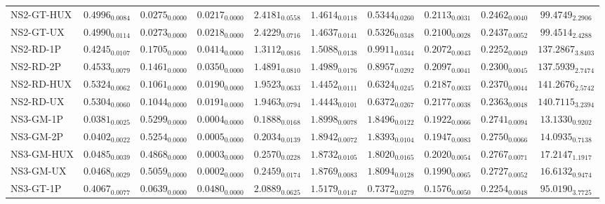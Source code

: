 \begin{longtable}{@{}lccccccccc@{}}
NS2-GT-HUX & $\mathbf{0.4996}_{0.0084}$ & $\mathbf{0.0275}_{0.0000}$ & $0.0217_{0.0000}$ & $\mathbf{2.4181}_{0.0558}$ & $1.4614_{0.0118}$ & $\mathbf{0.5344}_{0.0260}$ & $0.2113_{0.0031}$ & $0.2462_{0.0040}$ & $99.4749_{2.2906}$ \\
NS2-GT-UX & $\mathbf{0.4990}_{0.0114}$ & $\mathbf{0.0273}_{0.0000}$ & $0.0218_{0.0000}$ & $\mathbf{2.4229}_{0.0716}$ & $1.4637_{0.0141}$ & $\mathbf{0.5326}_{0.0348}$ & $0.2100_{0.0028}$ & $0.2437_{0.0052}$ & $99.4514_{2.4288}$ \\
NS2-RD-1P & $0.4245_{0.0107}$ & $0.1705_{0.0000}$ & $0.0414_{0.0000}$ & $1.3112_{0.0816}$ & $1.5088_{0.0138}$ & $0.9911_{0.0344}$ & $0.2072_{0.0043}$ & $0.2252_{0.0049}$ & $137.2867_{3.8403}$ \\
NS2-RD-2P & $0.4533_{0.0079}$ & $0.1461_{0.0000}$ & $0.0350_{0.0000}$ & $1.4891_{0.0810}$ & $1.4989_{0.0176}$ & $0.8957_{0.0292}$ & $0.2097_{0.0041}$ & $0.2300_{0.0045}$ & $137.5939_{2.7474}$ \\
NS2-RD-HUX & $\mathbf{0.5324}_{0.0062}$ & $0.1061_{0.0000}$ & $0.0190_{0.0000}$ & $1.9523_{0.0633}$ & $1.4452_{0.0111}$ & $\mathbf{0.6324}_{0.0245}$ & $0.2187_{0.0033}$ & $0.2370_{0.0044}$ & $141.2676_{2.5742}$ \\
NS2-RD-UX & $\mathbf{0.5304}_{0.0060}$ & $0.1044_{0.0000}$ & $0.0191_{0.0000}$ & $1.9463_{0.0794}$ & $1.4443_{0.0101}$ & $0.6372_{0.0267}$ & $0.2177_{0.0038}$ & $0.2363_{0.0048}$ & $140.7115_{3.2394}$ \\
NS3-GM-1P & $0.0381_{0.0025}$ & $0.5299_{0.0000}$ & $0.0004_{0.0000}$ & $0.1888_{0.0168}$ & $1.8998_{0.0078}$ & $1.8496_{0.0122}$ & $0.1922_{0.0066}$ & $0.2741_{0.0094}$ & $13.1330_{0.9202}$ \\
NS3-GM-2P & $0.0402_{0.0022}$ & $0.5254_{0.0000}$ & $0.0005_{0.0000}$ & $0.2034_{0.0139}$ & $1.8942_{0.0072}$ & $1.8393_{0.0104}$ & $0.1947_{0.0083}$ & $0.2750_{0.0066}$ & $14.0935_{0.7138}$ \\
NS3-GM-HUX & $0.0485_{0.0039}$ & $0.4868_{0.0000}$ & $0.0003_{0.0000}$ & $0.2570_{0.0228}$ & $1.8732_{0.0105}$ & $1.8020_{0.0165}$ & $0.2020_{0.0054}$ & $0.2767_{0.0071}$ & $17.2147_{1.1917}$ \\
NS3-GM-UX & $0.0468_{0.0029}$ & $0.5059_{0.0000}$ & $\mathbf{0.0002}_{0.0000}$ & $0.2459_{0.0174}$ & $1.8769_{0.0083}$ & $1.8094_{0.0128}$ & $0.1990_{0.0065}$ & $0.2727_{0.0052}$ & $16.6132_{0.9474}$ \\
NS3-GT-1P & $0.4067_{0.0077}$ & $0.0639_{0.0000}$ & $0.0480_{0.0000}$ & $2.0889_{0.0625}$ & $1.5179_{0.0147}$ & $0.7372_{0.0279}$ & $0.1576_{0.0050}$ & $0.2254_{0.0048}$ & $95.0190_{3.7725}$ \\

\end{longtable}
